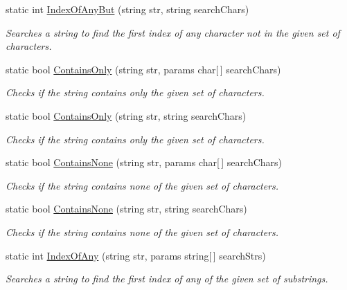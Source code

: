 \begin{DoxyCompactItemize}
static int \hyperlink{class_ultimate_1_1_utilities_1_1_string_utils_a3c1e179bbf9c1701ca4910275c634ea1}{Index\+Of\+Any\+But} (string str, string search\+Chars)
\begin{DoxyCompactList}\small\item\em Searches a string to find the first index of any character not in the given set of characters. \end{DoxyCompactList}\item 
static bool \hyperlink{class_ultimate_1_1_utilities_1_1_string_utils_a57e1e53f442433bfb9098823f1008b3d}{Contains\+Only} (string str, params char\mbox{[}$\,$\mbox{]} search\+Chars)
\begin{DoxyCompactList}\small\item\em Checks if the string contains only the given set of characters. \end{DoxyCompactList}\item 
static bool \hyperlink{class_ultimate_1_1_utilities_1_1_string_utils_a86e82ce1cfe4cdd03f07056a31fb5315}{Contains\+Only} (string str, string search\+Chars)
\begin{DoxyCompactList}\small\item\em Checks if the string contains only the given set of characters. \end{DoxyCompactList}\item 
static bool \hyperlink{class_ultimate_1_1_utilities_1_1_string_utils_a795905a9758b018d4e24cf43f7217ab6}{Contains\+None} (string str, params char\mbox{[}$\,$\mbox{]} search\+Chars)
\begin{DoxyCompactList}\small\item\em Checks if the string contains none of the given set of characters. \end{DoxyCompactList}\item 
static bool \hyperlink{class_ultimate_1_1_utilities_1_1_string_utils_a60add0abe8f1527f60facbe4177e82ec}{Contains\+None} (string str, string search\+Chars)
\begin{DoxyCompactList}\small\item\em Checks if the string contains none of the given set of characters. \end{DoxyCompactList}\item 
static int \hyperlink{class_ultimate_1_1_utilities_1_1_string_utils_a85e56ab87a3436fe0c1b9f7244bf2dea}{Index\+Of\+Any} (string str, params string\mbox{[}$\,$\mbox{]} search\+Strs)
\begin{DoxyCompactList}\small\item\em Searches a string to find the first index of any of the given set of substrings. \end{DoxyCompactList}\item 

\end{DoxyCompactItemize}
